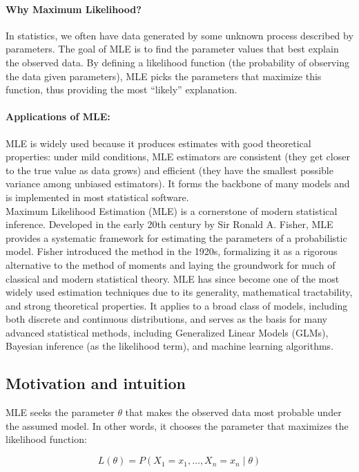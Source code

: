 \documentclass{book}
\begin{document}
\paragraph{Why Maximum Likelihood?}
In statistics, we often have data generated by some unknown process described by parameters. The goal of MLE is to find the parameter values that best explain the observed data. By defining a likelihood function (the probability of observing the data given parameters), MLE picks the parameters that maximize this function, thus providing the most “likely” explanation.

\paragraph{Applications of MLE:}
MLE is widely used because it produces estimates with good theoretical properties: under mild conditions, MLE estimators are consistent (they get closer to the true value as data grows) and efficient (they have the smallest possible variance among unbiased estimators). It forms the backbone of many models and is implemented in most statistical software.\\

Maximum Likelihood Estimation (MLE) is a cornerstone of modern statistical inference. Developed in the early 20th century by Sir Ronald A. Fisher, MLE provides a systematic framework for estimating the parameters of a probabilistic model. Fisher introduced the method in the 1920s, formalizing it as a rigorous alternative to the method of moments and laying the groundwork for much of classical and modern statistical theory.
MLE has since become one of the most widely used estimation techniques due to its generality, mathematical tractability, and strong theoretical properties. It applies to a broad class of models, including both discrete and continuous distributions, and serves as the basis for many advanced statistical methods, including Generalized Linear Models (GLMs), Bayesian inference (as the likelihood term), and machine learning algorithms.

\subsection{Motivation and intuition}
MLE seeks the parameter $\theta$ that makes the observed data most probable under the assumed model. In other words, it chooses the parameter that maximizes the likelihood function:

\[
L(\theta) = P(X_1 = x_1, \dots, X_n = x_n \mid \theta)
\]
\end{document}
